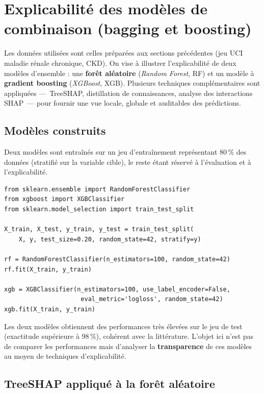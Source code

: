 \section{Explicabilité des modèles de combinaison (bagging et boosting)}
\label{sec:cas3}

Les données utilisées sont celles préparées aux sections précédentes (jeu UCI maladie rénale chronique, CKD). On vise à illustrer l'explicabilité de deux modèles d'ensemble : une \textbf{forêt aléatoire} (\emph{Random Forest}, RF) et un modèle à \textbf{gradient boosting} (\emph{XGBoost}, XGB). Plusieurs techniques complémentaires sont appliquées —~TreeSHAP, distillation de connaissances, analyse des interactions SHAP~— pour fournir une vue locale, globale et auditables des prédictions.

\subsection{Modèles construits}
\label{ssec:cas3-modeles}

Deux modèles sont entraînés sur un jeu d'entraînement représentant 80\,\% des données (stratifié sur la variable cible), le reste étant réservé à l'évaluation et à l'explicabilité.

\begin{lstlisting}[style=reportPython]
from sklearn.ensemble import RandomForestClassifier
from xgboost import XGBClassifier
from sklearn.model_selection import train_test_split

X_train, X_test, y_train, y_test = train_test_split(
    X, y, test_size=0.20, random_state=42, stratify=y)

rf = RandomForestClassifier(n_estimators=100, random_state=42)
rf.fit(X_train, y_train)

xgb = XGBClassifier(n_estimators=100, use_label_encoder=False,
                     eval_metric='logloss', random_state=42)
xgb.fit(X_train, y_train)
\end{lstlisting}

Les deux modèles obtiennent des performances très élevées sur le jeu de test (exactitude supérieure à 98\,\%), cohérent avec la littérature. L'objet ici n'est pas de comparer les performances mais d'analyser la \textbf{transparence} de ces modèles au moyen de techniques d'explicabilité.

\subsection{TreeSHAP appliqué à la forêt aléatoire}
\label{ssec:cas3-treeshap}

